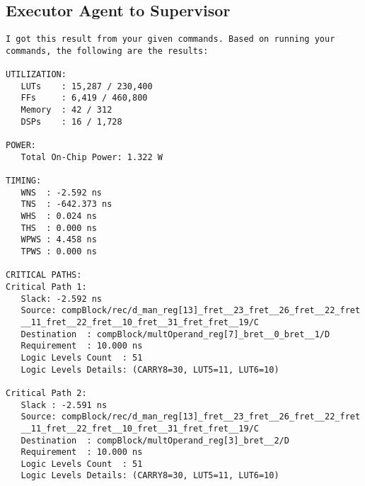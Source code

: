 \subsection{Executor Agent to Supervisor}
\vspace{-0.5em}
\begin{reviewerbox}
\begin{lstlisting}
I got this result from your given commands. Based on running your commands, the following are the results:

UTILIZATION:
   LUTs    : 15,287 / 230,400
   FFs     : 6,419 / 460,800
   Memory  : 42 / 312
   DSPs    : 16 / 1,728

POWER:
   Total On-Chip Power: 1.322 W

TIMING:
   WNS  : -2.592 ns
   TNS  : -642.373 ns
   WHS  : 0.024 ns
   THS  : 0.000 ns
   WPWS : 4.458 ns
   TPWS : 0.000 ns

CRITICAL PATHS:
Critical Path 1:
   Slack: -2.592 ns
   Source: compBlock/rec/d_man_reg[13]_fret__23_fret__26_fret__22_fret
   __11_fret__22_fret__10_fret__31_fret_fret__19/C
   Destination  : compBlock/multOperand_reg[7]_bret__0_bret__1/D
   Requirement  : 10.000 ns
   Logic Levels Count  : 51
   Logic Levels Details: (CARRY8=30, LUT5=11, LUT6=10)

Critical Path 2:
   Slack : -2.591 ns
   Source: compBlock/rec/d_man_reg[13]_fret__23_fret__26_fret__22_fret
   __11_fret__22_fret__10_fret__31_fret_fret__19/C
   Destination  : compBlock/multOperand_reg[3]_bret__2/D
   Requirement  : 10.000 ns
   Logic Levels Count  : 51
   Logic Levels Details: (CARRY8=30, LUT5=11, LUT6=10)
\end{lstlisting}
\end{reviewerbox}


